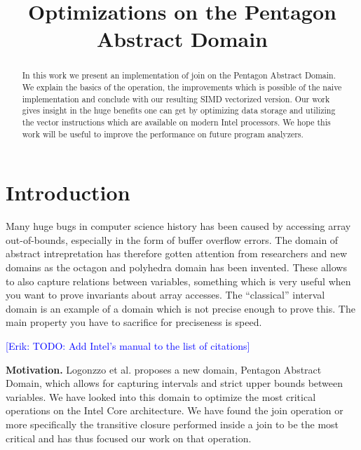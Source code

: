 \documentclass[letterpaper]{article}
\title{Optimizations on the Pentagon Abstract Domain}
\newcommand{\mypar}[1]{{\bf #1.}}
\newcommand{\erik}[1]{\textcolor{blue}{[Erik: #1]}}
\begin{document}
%
\maketitle
%


\begin{abstract}
In this work we present an implementation of join on the Pentagon Abstract Domain. We explain the basics of the operation, the improvements which is possible of the naive implementation and conclude with our resulting SIMD vectorized version. Our work gives insight in the huge benefits one can get by optimizing data storage and utilizing the vector instructions which are available on modern Intel processors. We hope this work will be useful to improve the performance on future program analyzers.
\end{abstract}

\section{Introduction}\label{sec:intro}
Many huge bugs in computer science history has been caused by accessing array out-of-bounds, especially in the form of buffer overflow errors. %
The domain of abstract intrepretation has therefore gotten attention from researchers and new domains as the octagon and polyhedra domain has been invented. These allows to also capture relations between variables, something which is very useful when you want to prove invariants about array accesses. The ``classical'' interval domain is an example of a domain which is not precise enough to prove this. The main property you have to sacrifice for preciseness is speed.

\erik{TODO: Add Intel's manual to the list of citations}

\mypar{Motivation} Logonzzo et al. proposes a new domain, Pentagon Abstract Domain, which allows for capturing intervals and strict upper bounds between variables. We have looked into this domain to optimize the most critical operations on the Intel Core architecture. We have found the join operation or more specifically the transitive closure performed inside a join to be the most critical and has thus focused our work on that operation.
\end{document}
